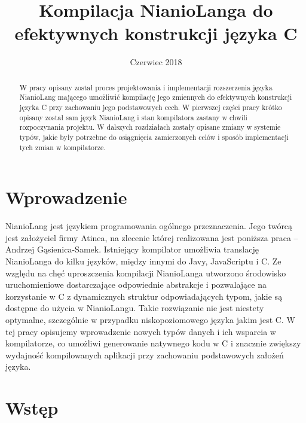 \documentclass[licencjacka]{pracamgr}
\title{Kompilacja NianioLanga do efektywnych konstrukcji języka C}
\date{Czerwiec 2018}
\begin{document}
\maketitle

\begin{abstract}
W pracy opisany został proces projektowania i implementacji rozszerzenia języka NianioLang mającego umożliwić
kompilację jego zmiennych do efektywnych konstrukcji języka C przy zachowaniu jego podstawowych cech.
W pierwszej części pracy krótko opisany został sam język NianioLang i stan kompilatora zastany w chwili
rozpoczynania projektu. W dalszych rozdziałach zostały opisane zmiany w systemie typów, jakie były potrzebne
do osiągnięcia zamierzonych celów i sposób implementacji tych zmian w kompilatorze.
\end{abstract}

\tableofcontents

\chapter*{Wprowadzenie}
  NianioLang jest językiem programowania ogólnego przeznaczenia. Jego twórcą jest
  założyciel firmy Atinea, na zlecenie której realizowana jest poniższa
  praca -- Andrzej Gąsienica-Samek.
  Istniejący kompilator umożliwia translację NianioLanga do kilku języków,
  między innymi do Javy, JavaScriptu i C.
  Ze względu na chęć uproszczenia kompilacji NianioLanga
  utworzono środowisko uruchomieniowe dostarczające odpowiednie abstrakcje
  i pozwalające na korzystanie w C z dynamicznych struktur odpowiadających typom,
  jakie są dostępne do użycia w NianioLangu. Takie rozwiązanie nie jest
  niestety optymalne, szczególnie w przypadku niskopoziomowego języka jakim
  jest C. W tej pracy opisujemy wprowadzenie nowych typów danych i ich wsparcia
  w kompilatorze, co umożliwi generowanie natywnego kodu w C i znacznie
  zwiększy wydajność kompilowanych aplikacji przy zachowaniu podstawowych założeń języka.
\chapter{Wstęp}
\end{document}
